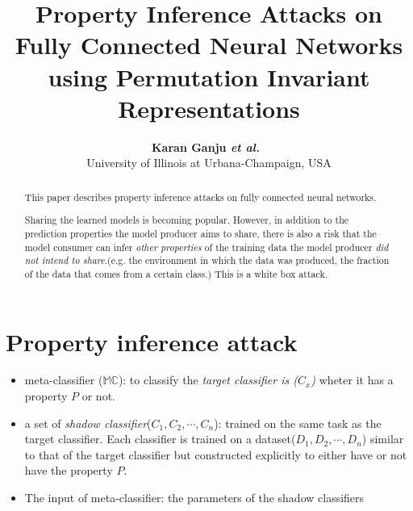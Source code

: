 \documentclass[11pt]{article}
\numberwithin{equation}{section}
\newcommand{\etal}{{\em et al.}\ }
\begin{document}


\title{Property Inference Attacks on Fully Connected Neural Networks using Permutation Invariant Representations}

\author{\textbf{Karan Ganju \etal} \\ University of Illinois at Urbana-Champaign, USA}


\maketitle

\begin{abstract}
This paper describes property inference attacks on fully connected neural networks.

Sharing the learned models is becoming popular. However, in addition to the prediction properties the model producer aims to share, there is also a risk that the model consumer can infer {\color{blue}\textit{other properties}} of the training data the model producer \textit{did not intend to share}.(e.g. the environment in which the data was produced, the fraction of the data that comes from a certain class.) This is a white box attack.

\end{abstract}

\section{Property inference attack} 

\begin{itemize}
    \item meta-classifier ($\mathbb M \mathbb C$): to classify the\textit{ target classifier is ($C_x$)} wheter it has a property $P$ or not.
    \item a set of \textit{shadow classifier}($C_1, C_2, \cdots ,C_n$): trained on the same task as the target classifier. Each classifier is trained on a dataset($D_1, D_2, \cdots, D_n$) similar to that of the target classifier but constructed explicitly to either have or not have the property $P$.
    \item The input of meta-classifier: the parameters of the shadow classifiers
\end{itemize}
\end{document}
